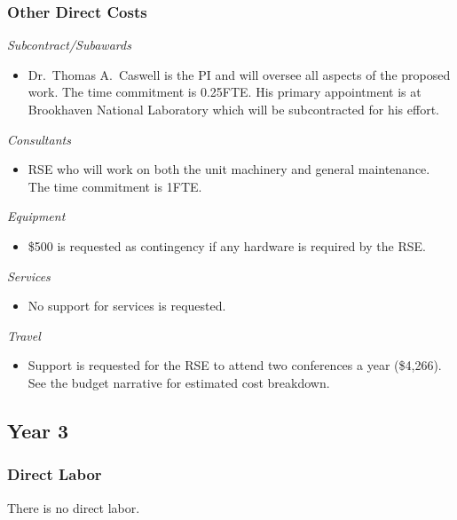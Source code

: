 \documentclass[12pt]{article}
\numberwithin{page}{section}
\begin{document}
\subsubsection{Other Direct Costs}
\textit{Subcontract/Subawards}
\begin{itemize}
\item Dr.\ Thomas A.\ Caswell is the PI and will oversee all aspects of the
  proposed work.  The time commitment is 0.25FTE.  His primary
  appointment is at Brookhaven National Laboratory which will be
  subcontracted for his effort.
\end{itemize}
\textit{Consultants}
\begin{itemize}
\item RSE who will work on both the unit machinery and general
  maintenance.  The time commitment is 1FTE.
\end{itemize}
\textit{Equipment}
\begin{itemize}
\item \$500 is requested as contingency if any hardware is required by the RSE.
\end{itemize}
\textit{Services}
\begin{itemize}
\item No support for services is requested.
\end{itemize}
\textit{Travel}
\begin{itemize}
\item Support is requested for the RSE to attend two conferences a
  year (\$4,266).  See the budget narrative for estimated cost
  breakdown.
\end{itemize}
\subsection{Year 3}
\subsubsection{Direct Labor}
There is no direct labor.
\end{document}
